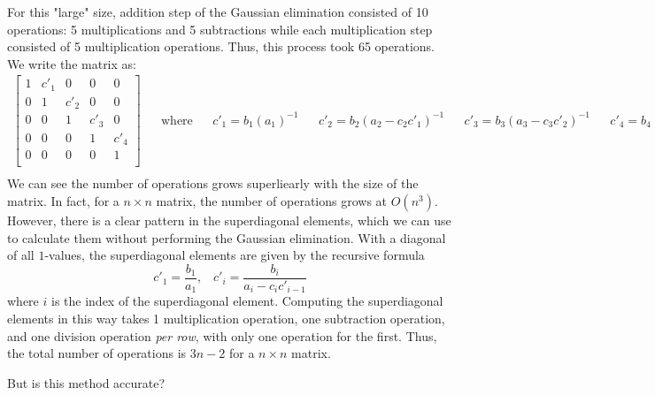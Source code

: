 For this "large" size, addition step of the Gaussian elimination consisted of 10 operations: 5 multiplications and 5 subtractions while each multiplication step consisted of 5 multiplication operations. Thus, this process took 65 operations. %
We write the matrix as:
\begin{align*}
    \begin{bmatrix}
        1 & c'_1 & 0 & 0 & 0 \\
        0 & 1 & c'_2 & 0 & 0 \\
        0 & 0 & 1 & c'_3 & 0 \\
        0 & 0 & 0 & 1 & c'_4 \\
        0 & 0 & 0 & 0 & 1 \\
    \end{bmatrix} & & \text{where} & & c'_1 = b_1(a_1)^{-1} & & c'_2 = b_2(a_2 - c_2c'_1)^{-1} & & c'_3 = b_3(a_3 - c_3c'_2)^{-1} & & c'_4 = b_4(a_4 - c_4c'_3)^{-1} \\
\end{align*}
We can see the number of operations grows superliearly with the size of the matrix. In fact, for a $n \times n$ matrix, the number of operations grows at $O(n^3)$. %
However, there is a clear pattern in the superdiagonal elements, which we can use to calculate them without performing the Gaussian elimination.
With a diagonal of all $1$-values, the superdiagonal elements are given by the recursive formula
$$c'_1 = \frac{b_1}{a_1}, \;\;\; c'_i = \frac{b_i}{a_i - c_{i}c'_{i-1}}$$
where $i$ is the index of the superdiagonal element. Computing the superdiagonal elements in this way takes 1 multiplication operation, one subtraction operation, and one division operation \textit{per row}, with only one operation for the first. Thus, the total number of operations is $3n - 2$ for a $n \times n$ matrix. %

But is this method accurate? 